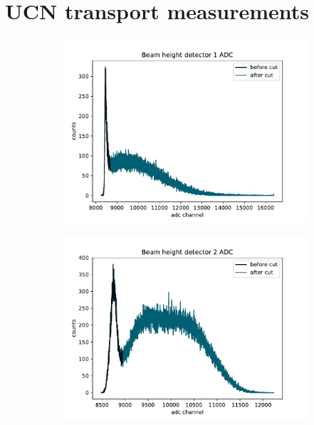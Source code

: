 
\section{UCN transport measurements}\label{sec:2021_ucn_transport_switchers}


\begin{figure}
\centering
\begin{subfigure}{.5\textwidth}
  \centering
  \includegraphics[width=\textwidth]{figures/2021_beam_det_1_adc.pdf}
  \caption{}\label{subfig:beam_det_1_adc}
\end{subfigure}%
\begin{subfigure}{.5\textwidth}
  \centering
  \includegraphics[width=\textwidth]{figures/2021_beam_det_2_adc.pdf}

\end{subfigure}
\end{figure}
